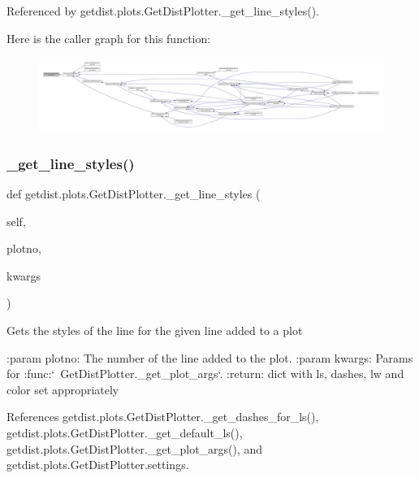 Referenced by getdist.\+plots.\+Get\+Dist\+Plotter.\+\_\+get\+\_\+line\+\_\+styles().

Here is the caller graph for this function\+:
\nopagebreak
\begin{figure}[H]
\begin{center}
\leavevmode
\includegraphics[width=350pt]{classgetdist_1_1plots_1_1GetDistPlotter_a3077b1755957ea13d90faa18e84af3d0_icgraph}
\end{center}
\end{figure}
\mbox{\label{classgetdist_1_1plots_1_1GetDistPlotter_a919928e323c1253b5e2687ad41b331df}} 
\subsubsection{\texorpdfstring{\+\_\+get\+\_\+line\+\_\+styles()}{\_get\_line\_styles()}}
{\footnotesize\ttfamily def getdist.\+plots.\+Get\+Dist\+Plotter.\+\_\+get\+\_\+line\+\_\+styles (\begin{DoxyParamCaption}\item[{}]{self,  }\item[{}]{plotno,  }\item[{}]{kwargs }\end{DoxyParamCaption})\hspace{0.3cm}{\ttfamily [private]}}

\begin{DoxyVerb}Gets the styles of the line for the given line added to a plot

:param plotno: The number of the line added to the plot.
:param kwargs: Params for :func:`~GetDistPlotter._get_plot_args`.
:return: dict with ls, dashes, lw and color set appropriately 
\end{DoxyVerb}
 

References getdist.\+plots.\+Get\+Dist\+Plotter.\+\_\+get\+\_\+dashes\+\_\+for\+\_\+ls(), getdist.\+plots.\+Get\+Dist\+Plotter.\+\_\+get\+\_\+default\+\_\+ls(), getdist.\+plots.\+Get\+Dist\+Plotter.\+\_\+get\+\_\+plot\+\_\+args(), and getdist.\+plots.\+Get\+Dist\+Plotter.\+settings.



